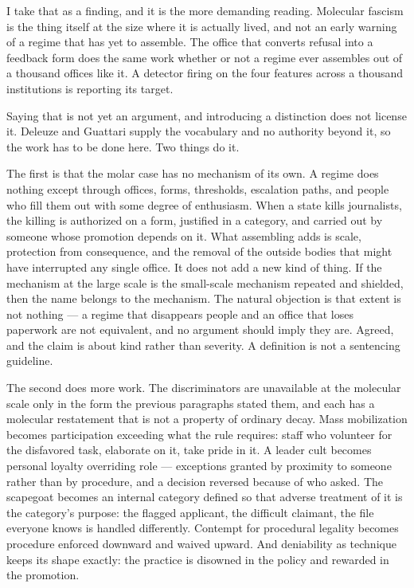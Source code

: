 I take that as a finding, and it is the more demanding reading. Molecular fascism is the thing itself at the size where it is actually lived, and not an early warning of a regime that has yet to assemble. The office that converts refusal into a feedback form does the same work whether or not a regime ever assembles out of a thousand offices like it. A detector firing on the four features across a thousand institutions is reporting its target.

Saying that is not yet an argument, and introducing a distinction does not license it. Deleuze and Guattari supply the vocabulary and no authority beyond it, so the work has to be done here. Two things do it.

The first is that the molar case has no mechanism of its own. A regime does nothing except through offices, forms, thresholds, escalation paths, and people who fill them out with some degree of enthusiasm. When a state kills journalists, the killing is authorized on a form, justified in a category, and carried out by someone whose promotion depends on it. What assembling adds is scale, protection from consequence, and the removal of the outside bodies that might have interrupted any single office. It does not add a new kind of thing. If the mechanism at the large scale is the small-scale mechanism repeated and shielded, then the name belongs to the mechanism. The natural objection is that extent is not nothing — a regime that disappears people and an office that loses paperwork are not equivalent, and no argument should imply they are. Agreed, and the claim is about kind rather than severity. A definition is not a sentencing guideline.

The second does more work. The discriminators are unavailable at the molecular scale only in the form the previous paragraphs stated them, and each has a molecular restatement that is not a property of ordinary decay. Mass mobilization becomes participation exceeding what the rule requires: staff who volunteer for the disfavored task, elaborate on it, take pride in it. A leader cult becomes personal loyalty overriding role — exceptions granted by proximity to someone rather than by procedure, and a decision reversed because of who asked. The scapegoat becomes an internal category defined so that adverse treatment of it is the category's purpose: the flagged applicant, the difficult claimant, the file everyone knows is handled differently. Contempt for procedural legality becomes procedure enforced downward and waived upward. And deniability as technique keeps its shape exactly: the practice is disowned in the policy and rewarded in the promotion.

